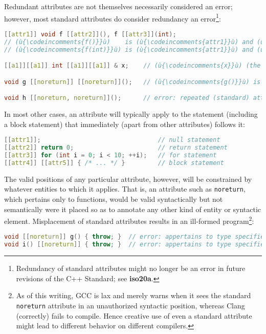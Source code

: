 \noindent Redundant attributes are not themselves necessarily considered an error;
however, most standard attributes do consider redundancy an
error{\cprotect\footnote{Redundancy of standard
attributes might no longer be an error in future revisions of the
C++ Standard; see \textbf{{iso20a}}.}}:

\begin{lstlisting}[language=C++]
[[attr1]] void f [[attr2]](), f [[attr3]](int);
// (ù{\codeincomments{f()}}ù)    is (ù{\codeincomments{attr1}}ù) and (ù{\codeincomments{attr2}}ù).
// (ù{\codeincomments{f(int)}}ù) is (ù{\codeincomments{attr1}}ù) and (ù{\codeincomments{attr3}}ù).

[[a1]][[a1]] int [[a1]][[a1]] & x;    // (ù{\codeincomments{x}}ù) (the reference itself) is (ù{\codeincomments{a1}}ù).

void g [[noreturn]] [[noreturn]]();   // (ù{\codeincomments{g()}}ù) is (ù{\codeincomments{noreturn}}ù).

void h [[noreturn, noreturn]]();      // error: repeated (standard) attribute
\end{lstlisting}

\noindent In most other cases, an attribute will typically apply to the statement
(including a block statement) that immediately (apart from other
attributes) follows it:

\begin{lstlisting}[language=C++]
[[attr1]];                                // null statement
[[attr2]] return 0;                       // return statement
[[attr3]] for (int i = 0; i < 10; ++i);   // for statement
[[attr4]] [[attr5]] { /* ... */ }         // block statement
\end{lstlisting}

\noindent The valid positions of any particular attribute, however, will be
constrained by whatever entities to which it applies. That is, an
attribute such as \texttt{noreturn}, which pertains only to functions,
would be valid syntactically but not semantically were it placed so as
to annotate any other kind of entity or syntactic element. Misplacement of
standard attributes results in an ill-formed
program{\cprotect\footnote{As of this writing, GCC is lax and merely
warns when it sees the standard \texttt{noreturn} attribute in an
unauthorized syntactic position, whereas Clang (correctly) fails to
compile. Hence creative use of even a standard attribute might
lead to different behavior on different compilers.}}:

\begin{lstlisting}[language=C++]
void [[noreturn]] g() { throw; }  // error: appertains to type specifier
void i() [[noreturn]] { throw; }  // error: appertains to type specifier
\end{lstlisting}


